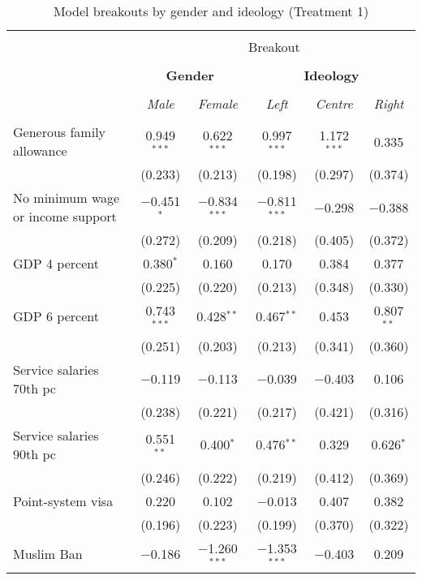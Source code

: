 \documentclass[12pt]{article}
\begin{document}
\begin{appendices}
\begin{landscape}
\begin{table}[!htbp] \centering \footnotesize
  \caption{Model breakouts by gender and ideology (Treatment 1)} 
  \label{tab:results_breakout1} 
\begin{tabular}{@{\extracolsep{5pt}}lccccc} 
\\[-1.8ex]\hline 
\hline \\[-1.8ex] 
 & \multicolumn{5}{c}{Breakout} \\
 \cline{2-6} \\
 & \multicolumn{2}{c}{\textbf{Gender}} & \multicolumn{3}{c}{\textbf{Ideology}} \\  
\cline{2-6} 
\\[-1.8ex] & \textit{Male} & \textit{Female} & \textit{Left} & \textit{Centre} & \textit{Right}\\ 
\hline \\[-1.8ex] 
 Generous family allowance & 0.949$^{***}$ & 0.622$^{***}$ & 0.997$^{***}$ & 1.172$^{***}$ & 0.335 \\ 
  & (0.233) & (0.213) & (0.198) & (0.297) & (0.374) \\ 
  No minimum wage or income support & $-$0.451$^{*}$ & $-$0.834$^{***}$ & $-$0.811$^{***}$ & $-$0.298 & $-$0.388 \\ 
  & (0.272) & (0.209) & (0.218) & (0.405) & (0.372) \\ 
  GDP 4 percent & 0.380$^{*}$ & 0.160 & 0.170 & 0.384 & 0.377 \\ 
  & (0.225) & (0.220) & (0.213) & (0.348) & (0.330) \\ 
  GDP 6 percent & 0.743$^{***}$ & 0.428$^{**}$ & 0.467$^{**}$ & 0.453 & 0.807$^{**}$ \\ 
  & (0.251) & (0.203) & (0.213) & (0.341) & (0.360) \\ 
  Service salaries 70th pc & $-$0.119 & $-$0.113 & $-$0.039 & $-$0.403 & 0.106 \\ 
  & (0.238) & (0.221) & (0.217) & (0.421) & (0.316) \\ 
  Service salaries 90th pc & 0.551$^{**}$ & 0.400$^{*}$ & 0.476$^{**}$ & 0.329 & 0.626$^{*}$ \\ 
  & (0.246) & (0.222) & (0.219) & (0.412) & (0.369) \\ 
  Point-system visa & 0.220 & 0.102 & $-$0.013 & 0.407 & 0.382 \\ 
  & (0.196) & (0.223) & (0.199) & (0.370) & (0.322) \\ 
  Muslim Ban & $-$0.186 & $-$1.260$^{***}$ & $-$1.353$^{***}$ & $-$0.403 & 0.209 \\ 

\end{tabular}
\end{table}
\end{landscape}
\end{appendices}
\end{document}
